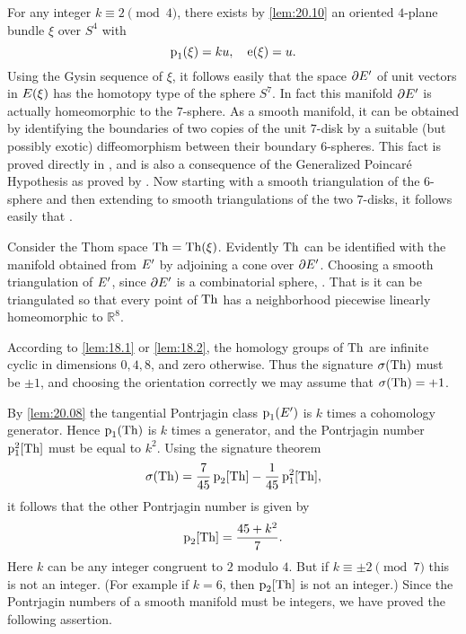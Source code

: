 \documentclass[../main]{subfiles}
\begin{document}
\begin{example} For any integer $k \equiv 2\pmod 4$, there exists by \ref{lem:20.10} an oriented $4$-plane bundle $\xi$ over $S^{4}$ with
\[
\operatorname{p}_{1}(\xi)=ku, \quad \operatorname{e}(\xi)=u .
\]
Using the Gysin sequence of $\xi$, it follows easily that the space $\partial E^{\prime}$ of unit vectors in $E(\xi)$ has the homotopy type of the sphere $S^{7}$. In fact this manifold $\partial E^{\prime}$ is actually homeomorphic to the $7$-sphere. As a smooth manifold, it can be obtained by identifying the boundaries of two copies of the unit $7$-disk by a suitable (but possibly exotic) diffeomorphism between their boundary $6$-spheres. This fact is proved directly in \cite{milnor1956}, and is also a consequence of the Generalized Poincar\'e Hypothesis as proved by \cite{smale1959}. Now starting with a smooth triangulation of the $6$-sphere and then extending to smooth triangulations of the two $7$-disks, it follows easily that .
\end{example}

Consider the Thom space $\operatorname{Th}=\operatorname{Th}(\xi)$. Evidently $\operatorname{Th}$ can be identified with the manifold obtained from $E^{\prime}$ by adjoining a cone over $\partial E^{\prime}$. Choosing a smooth triangulation of $E^{\prime}$, since $\partial E^{\prime}$ is a combinatorial sphere, . That is it can be triangulated so that every point of $\operatorname{Th}$ has a neighborhood piecewise linearly homeomorphic to $\mathbb{R}^{8}$.

According to \ref{lem:18.1} or \ref{lem:18.2}, the homology groups of $\operatorname{Th}$ are infinite cyclic in dimensions $0,4,8$, and zero otherwise. Thus the signature $\sigma(\operatorname{Th})$ must be $\pm 1$, and choosing the orientation correctly we may assume that $\sigma(\operatorname{Th})=+1$.

By \ref{lem:20.08} the tangential Pontrjagin class $\operatorname{p}_{1}(E^{\prime})$ is $k$ times a cohomology generator. Hence $\operatorname{p}_{1}(\operatorname{Th})$ is $k$ times a generator, and the Pontrjagin number $\operatorname{p}_{1}^{2}[\operatorname{Th}]$ must be equal to $k^{2}$. Using the signature theorem
\[
\sigma(\operatorname{Th})=\frac{7}{45} \operatorname{p}_{2}[\operatorname{Th}]-\frac{1}{45} \operatorname{p}_{1}^{2}[\operatorname{Th}],
\]
it follows that the other Pontrjagin number is given by
\[
\operatorname{p}_{2}[\operatorname{Th}]=\dfrac{45+k^{2}}{7} .
\]
Here $k$ can be any integer congruent to $2$ modulo $4$. But if $k \equiv \pm 2\pmod{7}$ this is not an integer. (For example if $k=6$, then $\operatorname{p}_{2}[\operatorname{Th}]$ is not an integer.) Since the Pontrjagin numbers of a smooth manifold must be integers, we have proved the following assertion.
\end{document}
